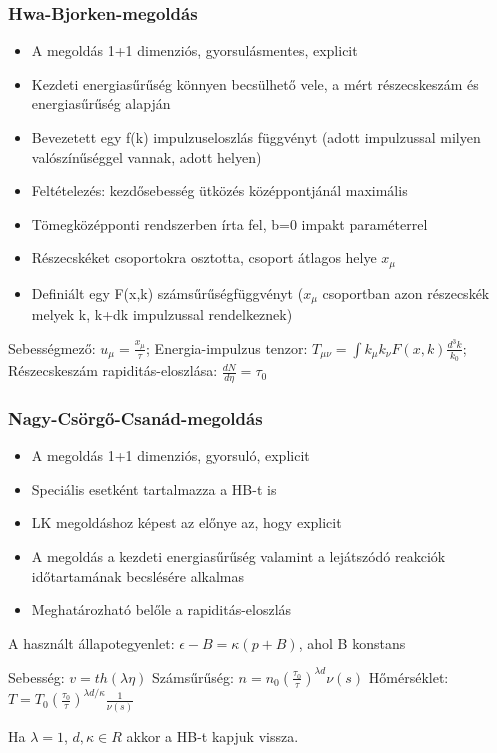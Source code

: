 \documentclass{beamer}
\begin{document}
\begin{frame}
\frametitle{Hwa-Bjorken-megoldás}
\begin{itemize}
\item A megoldás 1+1 dimenziós, gyorsulásmentes, explicit
\item Kezdeti energiasűrűség könnyen becsülhető vele, a mért részecskeszám és energiasűrűség alapján
\item Bevezetett egy f(k) impulzuseloszlás függvényt (adott impulzussal milyen valószínűséggel vannak, adott helyen) 
\item Feltételezés: kezdősebesség ütközés középpontjánál maximális
\item Tömegközépponti rendszerben írta fel, b=0 impakt paraméterrel
\item Részecskéket csoportokra osztotta, csoport átlagos helye $x_\mu$
\item Definiált egy F(x,k) számsűrűségfüggvényt ($x_\mu$ csoportban azon részecskék melyek k, k+dk impulzussal rendelkeznek)
\end{itemize}
Sebességmező: $u_\mu=\frac{x_\mu}{\tau}$;
Energia-impulzus tenzor: $T_{\mu\nu}=\int k_\mu k_\nu F(x,k) \frac{d^3k}{k_0}$;
Részecskeszám rapiditás-eloszlása: $\frac{d N}{d\eta}=\tau_0$
\end{frame}

\begin{frame}
\frametitle{Nagy-Csörgő-Csanád-megoldás}
\begin{itemize}
\item A megoldás 1+1 dimenziós, gyorsuló, explicit
\item Speciális esetként tartalmazza a HB-t is
\item LK megoldáshoz képest az előnye az, hogy explicit
\item A megoldás a kezdeti energiasűrűség valamint a lejátszódó reakciók időtartamának becslésére alkalmas
\item Meghatározható belőle a rapiditás-eloszlás
\end{itemize}

A használt állapotegyenlet: $\epsilon-B=\kappa(p+B)$, ahol B konstans

Sebesség: $v=th(\lambda\eta)$
Számsűrűség: $n=n_0(\frac{\tau_0}{\tau})^{\lambda d}\nu(s)$
Hőmérséklet: $T=T_0(\frac{\tau_0}{\tau})^{\lambda d/\kappa}\frac{1}{\nu(s)}$

Ha $\lambda=1$, $d,\kappa\in R$ akkor a HB-t kapjuk vissza.

\end{frame}
\end{document}
